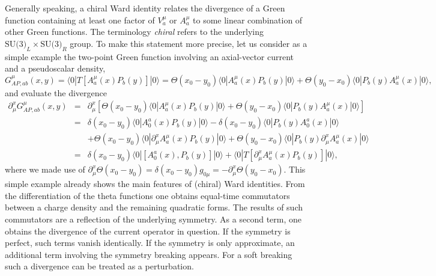 \documentclass[twoside,12pt]{article}
\begin{document}
   Generally speaking, a chiral Ward identity relates the divergence
of a Green function containing at least one factor of $V^{\mu}_a$ or
$A^{\mu}_a$ to some linear combination of other Green functions.
   The terminology {\em chiral} refers to the underlying $\mbox{SU(3)}_L\times
\mbox{SU(3)}_R$ group.
   To make this statement more precise, let us consider as a simple example
the two-point Green function involving an axial-vector current and a
pseudoscalar density,
\begin{equation}
\label{2:1:6:gfaav}
G^\mu_{AP,ab}(x,y)=\langle 0| T[A^\mu_a(x) P_b(y)]|0\rangle
=\Theta(x_0-y_0)\langle 0|A^\mu_a(x) P_b(y)|0\rangle
+\Theta(y_0-x_0)\langle 0|P_b(y) A^\mu_a(x)|0\rangle,
\end{equation}
   and evaluate the divergence
\begin{eqnarray*}
\partial_\mu^x G^{\mu}_{AP,ab}(x,y)
&=&
 \partial_\mu^x [\Theta(x_0-y_0)\langle 0| A^\mu_a(x) P_b(y)|0\rangle
+\Theta(y_0-x_0)\langle 0|  P_b(y)A^\mu_a(x)|0\rangle ]\\
&=&\delta(x_0-y_0)\langle 0| A_0^a(x) P_b(y)|0\rangle
-\delta(x_0-y_0)\langle 0|  P_b(y)A_0^a (x)|0\rangle\\
&&
+\Theta(x_0-y_0)\langle 0|\partial_\mu^x A^\mu_a(x) P_b(y)|0\rangle
+\Theta(y_0-x_0)\langle 0| P_b(y)\partial_\mu^x A^\mu_a(x)|0\rangle\\
&=&\delta(x_0-y_0)\langle 0|[A^a_0(x),P_b(y)]|0\rangle
+\langle 0|T[\partial_\mu^x A^\mu_a(x) P_b(y)]|0\rangle,
\end{eqnarray*}
   where we made use of $\partial_\mu^x \Theta(x_0-y_0)=\delta(x_0-y_0)
g_{0\mu}=-\partial_\mu^x \Theta(y_0-x_0)$.
   This simple example already shows the main features of (chiral) Ward
identities.
   From the differentiation of the theta functions
one obtains equal-time commutators between a charge density and the
remaining quadratic forms.
   The results of such commutators are a reflection of the underlying symmetry.
   As a second term, one obtains the divergence of the current operator in
question.
   If the symmetry is perfect, such terms vanish identically.
   If the symmetry is only approximate, an additional term involving the
symmetry breaking appears.
   For a soft breaking such a divergence can be treated as a perturbation.
\end{document}
